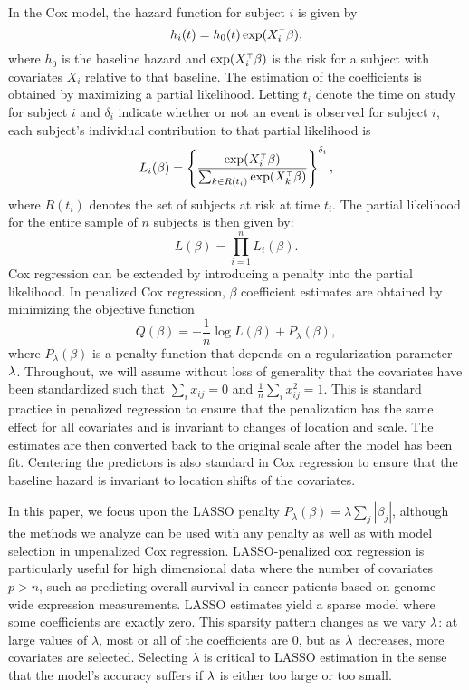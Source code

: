 \par In the Cox model, the hazard function for subject $i$ is given by 
\begin{equation*}
  h_{i}(t) = h_{0}(t) \exp( X_{i}^{\scriptscriptstyle\top}\beta),
\end{equation*} 
where $h_{0}$ is the baseline hazard and $\exp(X_i^{\scriptscriptstyle\top}\beta)$ is the risk for a subject with covariates $X_i$ relative to that baseline.  The estimation of the coefficients is obtained by maximizing a partial likelihood.  Letting $t_i$ denote the time on study for subject $i$ and $\delta_{i}$ indicate whether or not an event is observed for subject $i$, each subject's individual contribution to that partial likelihood is
\begin{equation}
  \label{eq:cox-pl-subj}
  L_{i}(\beta) = \left \{\frac{\exp ( X_{i}^{\scriptscriptstyle\top}\beta)}{\sum_{ k \in R(t_{i})}\exp ( X_{k}^{\scriptscriptstyle\top} \beta)}\right \}^{\delta_{i}},
\end{equation}
where $R(t_{i})$ denotes the set of subjects at risk at time $t_{i}$.  The partial likelihood for the entire sample of $n$ subjects is then given by:
\begin{equation}
  \label{eq:cox-pl-sum}
  L(\beta) =\prod_{i = 1}^{n} L_{i}(\beta).
\end{equation}
Cox regression can be extended by introducing a penalty into the partial likelihood.  In penalized Cox regression, $\beta$ coefficient estimates are obtained by minimizing the objective function
\begin{equation}
  \label{eq:obj}
  Q(\beta) = - \frac{1}{n} \log L(\beta) + P_{\lambda}(\beta),
\end{equation}
where $P_{\lambda}(\beta)$ is a penalty function that depends on a regularization parameter $\lambda$.  Throughout, we will assume without loss of generality that the covariates have been standardized such that $\sum_i x_{ij} = 0$ and $\tfrac{1}{n}\sum_i x_{ij}^2=1$.  This is standard practice in penalized regression to ensure that the penalization has the same effect for all covariates and is invariant to changes of location and scale.  The estimates are then converted back to the original scale after the model has been fit.  Centering the predictors is also standard in Cox regression to ensure that the baseline hazard is invariant to location shifts of the covariates.

\par In this paper, we focus upon the LASSO penalty $P_{\lambda}(\beta) = \lambda \sum_{j} |\beta_{j}|$, although the methods we analyze can be used with any penalty as well as with model selection in unpenalized Cox regression. LASSO-penalized cox regression is particularly useful for high dimensional data where the number of covariates $p > n$, such as predicting overall survival in cancer patients based on genome-wide expression measurements. LASSO estimates yield a sparse model where some coefficients are exactly zero. This sparsity pattern changes as we vary $\lambda$: at large values of $\lambda$, most or all of the coefficients are 0, but as $\lambda$ decreases, more covariates are selected. Selecting $\lambda$ is critical to LASSO estimation in the sense that the model's accuracy suffers if $\lambda$ is either too large or too small.

